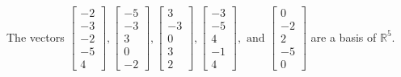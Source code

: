 \begin{exercise}
\begin{exerciseStatement}
  \end{exerciseStatement}
  \begin{exerciseAnswer}
   The vectors \(\left[\begin{array}{r}
-2 \\
-3 \\
-2 \\
-5 \\
4
\end{array}\right] , \left[\begin{array}{r}
-5 \\
-3 \\
3 \\
0 \\
-2
\end{array}\right] , \left[\begin{array}{r}
3 \\
-3 \\
0 \\
3 \\
2
\end{array}\right] , \left[\begin{array}{r}
-3 \\
-5 \\
4 \\
-1 \\
4
\end{array}\right] , \text{ and } \left[\begin{array}{r}
0 \\
-2 \\
2 \\
-5 \\
0
\end{array}\right]\) 
  	 are  a basis of \(\mathbb{R}^5\).
  


  \end{exerciseAnswer}
\end{exercise}